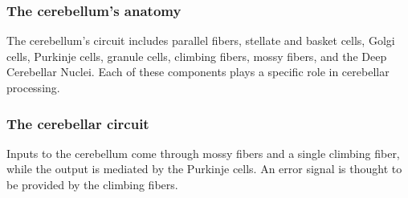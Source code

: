\documentclass[11pt]{book} %
\begin{document}
\subsubsection{The cerebellum's anatomy}
The cerebellum's circuit includes parallel fibers, stellate and basket cells, Golgi cells, Purkinje cells, granule cells, climbing fibers, mossy fibers, and the Deep Cerebellar Nuclei. Each of these components plays a specific role in cerebellar processing.

\subsubsection{The cerebellar circuit}
Inputs to the cerebellum come through mossy fibers and a single climbing fiber, while the output is mediated by the Purkinje cells. An error signal is thought to be provided by the climbing fibers.
\end{document}

